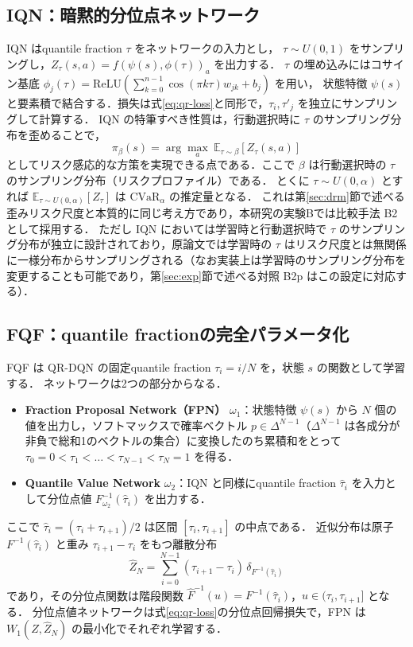 \documentclass[a4paper,10pt]{jsarticle}
\theoremstyle{definition}
\newcommand{\CVaR}{\mathrm{CVaR}}
\newcommand{\Wone}{W_1}
\newcommand{\Finv}{F^{-1}}
\newcommand{\Fhinv}{\hat{F}^{-1}}
\newcommand{\E}{\mathbb{E}}
\begin{document}
\subsection{IQN：暗黙的分位点ネットワーク}
IQN \cite{dabney2018iqn} はquantile fraction $\tau$ をネットワークの入力とし，
$\tau\sim U(0,1)$ をサンプリングし，$Z_\tau(s,a)=f(\psi(s),\phi(\tau))_a$ を出力する．
$\tau$ の埋め込みにはコサイン基底 $\phi_j(\tau)=\mathrm{ReLU}\!\left(\sum_{k=0}^{n-1}\cos(\pi k\tau)w_{jk}+b_j\right)$ を用い，
状態特徴 $\psi(s)$ と要素積で結合する．損失は式\eqref{eq:qr-loss}と同形で，$\tau_i,\tau'_j$ を独立にサンプリングして計算する．
IQN の特筆すべき性質は，行動選択時に $\tau$ のサンプリング分布を歪めることで，
\begin{equation}
  \pi_\beta(s)=\arg\max_a\ \E_{\tau\sim\beta}\left[Z_\tau(s,a)\right]
\end{equation}
としてリスク感応的な方策を実現できる点である．ここで $\beta$ は行動選択時の $\tau$ のサンプリング分布（リスクプロファイル）である．
とくに $\tau\sim U(0,\alpha)$ とすれば $\E_{\tau\sim U(0,\alpha)}[Z_\tau]$ は $\CVaR_\alpha$ の推定量となる．
これは第\ref{sec:drm}節で述べる歪みリスク尺度と本質的に同じ考え方であり，本研究の実験Bでは比較手法 B2 として採用する．
ただし IQN においては学習時と行動選択時で $\tau$ のサンプリング分布が独立に設計されており，原論文では学習時の $\tau$ はリスク尺度とは無関係に一様分布からサンプリングされる（なお実装上は学習時のサンプリング分布を変更することも可能であり，第\ref{sec:exp}節で述べる対照 B2p はこの設定に対応する）．

\subsection{FQF：quantile fractionの完全パラメータ化}
\label{subsec:fqf}
FQF \cite{yang2019fqf} は QR-DQN の固定quantile fraction $\tau_i=i/N$ を，状態 $s$ の関数として学習する．
ネットワークは2つの部分からなる．
\begin{itemize}
  \item \textbf{Fraction Proposal Network（FPN）} $\omega_1$：状態特徴 $\psi(s)$ から $N$ 個の値を出力し，ソフトマックスで確率ベクトル $p\in\Delta^{N-1}$（$\Delta^{N-1}$ は各成分が非負で総和1のベクトルの集合）に変換したのち累積和をとって
  $\tau_0=0<\tau_1<\dots<\tau_{N-1}<\tau_N=1$ を得る．
  \item \textbf{Quantile Value Network} $\omega_2$：IQN と同様にquantile fraction $\hat\tau_i$ を入力として分位点値 $\Finv_{\omega_2}(\hat\tau_i)$ を出力する．
\end{itemize}
ここで $\hat\tau_i=(\tau_i+\tau_{i+1})/2$ は区間 $[\tau_i,\tau_{i+1}]$ の中点である．
近似分布は原子 $\Finv(\hat\tau_i)$ と重み $\tau_{i+1}-\tau_i$ をもつ離散分布
\begin{equation}
  \hat Z_N=\sum_{i=0}^{N-1}(\tau_{i+1}-\tau_i)\,\delta_{\Finv(\hat\tau_i)}
  \label{eq:zhat}
\end{equation}
であり，その分位点関数は階段関数 $\Fhinv(u)=\Finv(\hat\tau_i)$，$u\in(\tau_i,\tau_{i+1}]$ となる．
分位点値ネットワークは式\eqref{eq:qr-loss}の分位点回帰損失で，FPN は $\Wone(Z,\hat Z_N)$ の最小化でそれぞれ学習する．
\end{document}
